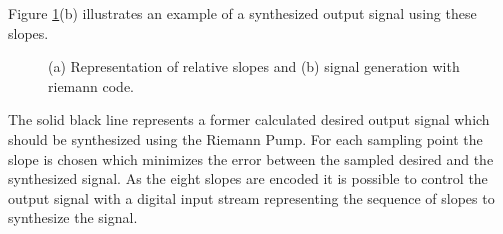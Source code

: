 \documentclass[journal]{IEEEtran}
\begin{document}
Figure \ref{fig:SlopeSynthSignal}(b) illustrates an example of a synthesized output signal using these slopes.
%
\begin{figure}[htb]
  \centering
	\begin{scriptsize}
  	\def\svgwidth{\columnwidth}
 	 
  	\caption{(a) Representation of relative slopes and (b) signal generation with riemann code.}
  	\label{fig:SlopeSynthSignal}
	\end{scriptsize}
\end{figure}
%
The solid black line represents a former calculated desired output signal which should be synthesized using the Riemann Pump.
For each sampling point the slope is chosen which minimizes the error between the sampled desired and the synthesized signal.
As the eight slopes are encoded it is possible to control the output signal with a digital input stream representing the sequence of slopes to synthesize the signal.
\end{document}
